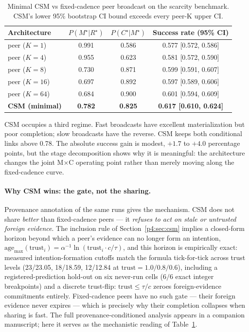 \documentclass{article}
\begin{document}
\begin{table}[ht]
\caption{Minimal CSM vs fixed-cadence peer broadcast on the scarcity benchmark. CSM's lower 95\% bootstrap CI bound exceeds every peer-K upper CI.}
\label{p4:tab:csm-results}
\centering
\small
\begin{tabular}{l c c c}
\toprule
Architecture & $P(M^\star|R^\star)$ & $P(C^\star|M^\star)$ & Success rate (95\% CI) \\
\midrule
peer ($K{=}1$)  & 0.991 & 0.586 & 0.577 [0.572, 0.586] \\
peer ($K{=}4$)  & 0.955 & 0.623 & 0.581 [0.572, 0.590] \\
peer ($K{=}8$)  & 0.730 & 0.871 & 0.599 [0.591, 0.607] \\
peer ($K{=}16$) & 0.697 & 0.892 & 0.597 [0.589, 0.606] \\
peer ($K{=}64$) & 0.684 & 0.900 & 0.601 [0.594, 0.609] \\
\textbf{CSM (minimal)} & \textbf{0.782} & \textbf{0.825} & \textbf{0.617 [0.610, 0.624]} \\
\bottomrule
\end{tabular}
\end{table}

CSM occupies a third regime. Fast broadcasts have excellent
materialization but poor completion; slow broadcasts have the reverse.
CSM keeps both conditional links above 0.78. The absolute success gain
is modest, $+1.7$ to $+4.0$ percentage points, but the stage
decomposition shows why it is meaningful: the architecture changes the
joint M$\times$C operating point rather than merely moving along the
fixed-cadence curve.

\paragraph{Why CSM wins: the gate, not the sharing.} Provenance
annotation of the same runs gives the mechanism. CSM does not share
\emph{better} than fixed-cadence peers --- it \emph{refuses to act on
stale or untrusted foreign evidence}. The inclusion rule of
Section~\ref{p4:sec:csm} implies a closed-form horizon beyond which a
peer's evidence can no longer form an intention,
$\mathrm{age}_{\max}(\mathrm{trust}_i) = \alpha^{-1}
\ln(\mathrm{trust}_i \cdot c/\tau)$, and this horizon is empirically
exact: measured intention-formation cutoffs match the formula
tick-for-tick across trust levels (23/23.05, 18/18.59, 12/12.84 at
$\mathrm{trust}=1.0/0.8/0.6$), including a registered-prediction
hold-out on six never-run cells ($6/6$ exact integer breakpoints) and
a discrete trust-flip: $\mathrm{trust}\le\tau/c$ zeroes
foreign-evidence commitments entirely. Fixed-cadence peers have no
such gate --- their foreign evidence never expires --- which is
precisely why their completion collapses when sharing is fast. The
full provenance-conditioned analysis appears in a companion
manuscript; here it serves as the mechanistic reading of
Table~\ref{p4:tab:csm-results}.
\end{document}
